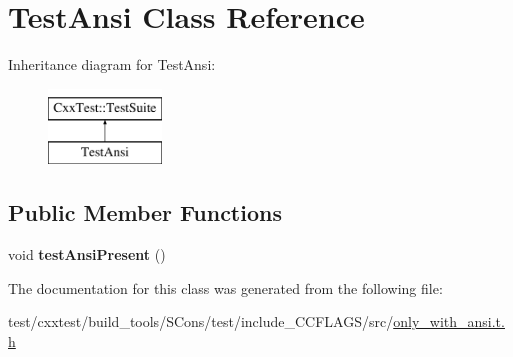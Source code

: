 \hypertarget{classTestAnsi}{\section{Test\-Ansi Class Reference}
\label{classTestAnsi}
}
Inheritance diagram for Test\-Ansi\-:\begin{figure}[H]
\begin{center}
\leavevmode
\includegraphics[height=2.000000cm]{classTestAnsi}
\end{center}
\end{figure}
\subsection*{Public Member Functions}
\begin{DoxyCompactItemize}
\item 
\hypertarget{classTestAnsi_a932af407bce1c564d8669f583d73cf85}{void {\bfseries test\-Ansi\-Present} ()}\label{classTestAnsi_a932af407bce1c564d8669f583d73cf85}

\end{DoxyCompactItemize}


The documentation for this class was generated from the following file\-:\begin{DoxyCompactItemize}
\item 
test/cxxtest/build\-\_\-tools/\-S\-Cons/test/include\-\_\-\-C\-C\-F\-L\-A\-G\-S/src/\hyperlink{only__with__ansi_8t_8h}{only\-\_\-with\-\_\-ansi.\-t.\-h}\end{DoxyCompactItemize}
